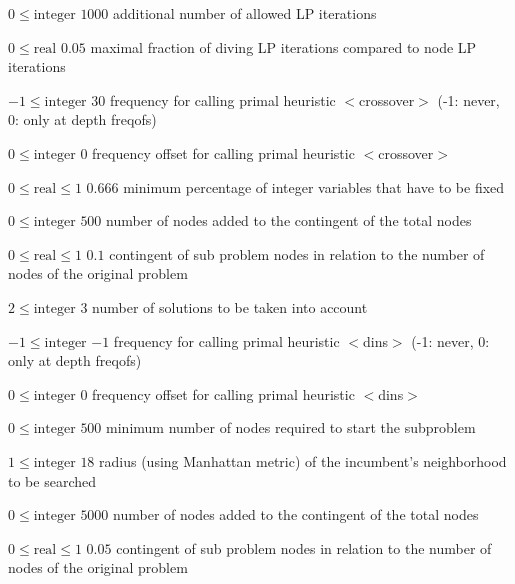 %
{$0\leq\textrm{integer}$}%
{$1000$}%
{additional number of allowed LP iterations}%
{}

%
{$0\leq\textrm{real}$}%
{$0.05$}%
{maximal fraction of diving LP iterations compared to node LP iterations}%
{}

%
{$-1\leq\textrm{integer}$}%
{$30$}%
{frequency for calling primal heuristic $<$crossover$>$ (-1: never, 0: only at depth freqofs)}%
{}

%
{$0\leq\textrm{integer}$}%
{$0$}%
{frequency offset for calling primal heuristic $<$crossover$>$}%
{}

%
{$0\leq\textrm{real}\leq1$}%
{$0.666$}%
{minimum percentage of integer variables that have to be fixed }%
{}

%
{$0\leq\textrm{integer}$}%
{$500$}%
{number of nodes added to the contingent of the total nodes}%
{}

%
{$0\leq\textrm{real}\leq1$}%
{$0.1$}%
{contingent of sub problem nodes in relation to the number of nodes of the original problem}%
{}

%
{$2\leq\textrm{integer}$}%
{$3$}%
{number of solutions to be taken into account}%
{}

%
{$-1\leq\textrm{integer}$}%
{$-1$}%
{frequency for calling primal heuristic $<$dins$>$ (-1: never, 0: only at depth freqofs)}%
{}

%
{$0\leq\textrm{integer}$}%
{$0$}%
{frequency offset for calling primal heuristic $<$dins$>$}%
{}

%
{$0\leq\textrm{integer}$}%
{$500$}%
{minimum number of nodes required to start the subproblem}%
{}

%
{$1\leq\textrm{integer}$}%
{$18$}%
{radius (using Manhattan metric) of the incumbent's neighborhood to be searched}%
{}

%
{$0\leq\textrm{integer}$}%
{$5000$}%
{number of nodes added to the contingent of the total nodes}%
{}

%
{$0\leq\textrm{real}\leq1$}%
{$0.05$}%
{contingent of sub problem nodes in relation to the number of nodes of the original problem}%
{}

